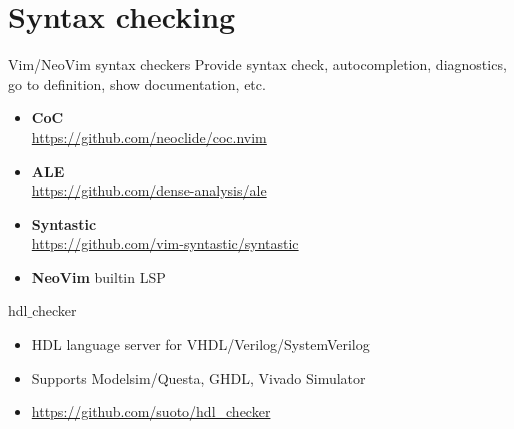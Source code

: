 \documentclass[aspectratio=169]{beamer}
\newcommand{\myurl}[1]{{\color{indigo}\url{#1}}}%
\begin{document}
\section*{Syntax checking}
\begin{frame}{\secname}

  \begin{block}{Vim/NeoVim syntax checkers}
    Provide syntax check, autocompletion, diagnostics, go to definition, show documentation, etc.
  \begin{itemize}
    \item \textbf{CoC}  \\ \myurl{https://github.com/neoclide/coc.nvim} 
    \item \textbf{ALE} \\ \myurl{https://github.com/dense-analysis/ale}
    \item \textbf{Syntastic} \\ \myurl{https://github.com/vim-syntastic/syntastic}
    \item \textbf{NeoVim} builtin LSP
  \end{itemize}
  \end{block}

  \begin{block}{hdl$\_$checker}
    \begin{itemize}
     \item HDL language server  for VHDL/Verilog/SystemVerilog
     \item Supports Modelsim/Questa, GHDL, Vivado Simulator
     \item \myurl{https://github.com/suoto/hdl_checker}
    \end{itemize}
    
  \end{block}
    
\end{frame}

\end{document}
